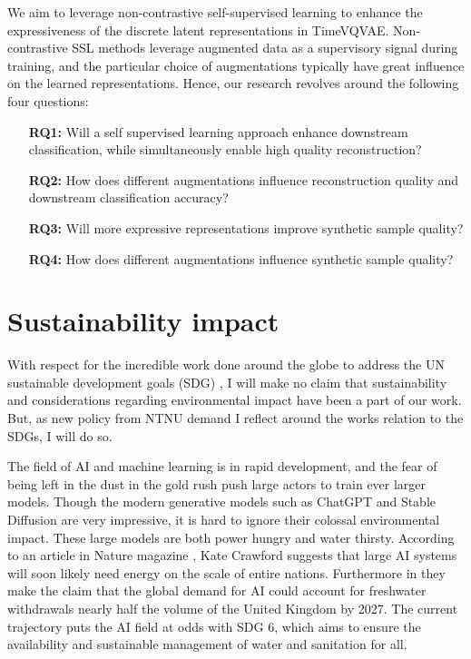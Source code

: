 \documentclass[../../thesis.tex]{subfiles}
\begin{document}
We aim to leverage non-contrastive self-supervised learning to enhance the expressiveness of the discrete latent representations in TimeVQVAE. Non-contrastive SSL methods leverage augmented data as a supervisory signal during training, and the particular choice of augmentations typically have great influence on the learned representations. Hence, our research revolves around the following four questions:
\begin{itemize}
	\item[\textbf{RQ1:}] Will a self supervised learning approach enhance downstream classification, while simultaneously enable high quality reconstruction?
	\item[\textbf{RQ2:}] How does different augmentations influence reconstruction quality and downstream classification accuracy? 
	\item[\textbf{RQ3:}] Will more expressive representations improve synthetic sample quality?
	\item[\textbf{RQ4:}] How does different augmentations influence synthetic sample quality?
\end{itemize}


\section{Sustainability impact}

With respect for the incredible work done around the globe to address the UN sustainable development goals (SDG) \cite{Agenda2023}, I will make no claim that sustainability and considerations regarding environmental impact have been a part of our work. But, as new policy from NTNU demand I reflect around the works relation to the SDGs, I will do so.\newline 

The field of AI and machine learning is in rapid development, and the fear of being left in the dust in the gold rush push large actors to train ever larger models. Though the modern generative models such as ChatGPT and Stable Diffusion are very impressive, it is hard to ignore their colossal environmental impact. These large models are both power hungry and water thirsty. According to an article in Nature magazine \cite{AI_energy}, Kate Crawford suggests that large AI systems will soon likely need energy on the scale of entire nations. Furthermore in \cite{li2023making} they make the claim that the global demand for AI could account for freshwater withdrawals nearly half the volume of the United Kingdom by 2027. The current trajectory puts the AI field at odds with SDG 6, which aims to ensure the availability and sustainable management of water and sanitation for all.\newline
\end{document}
